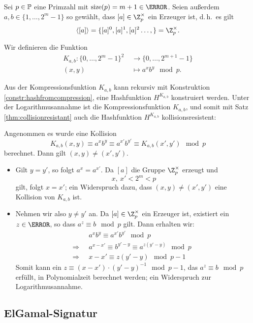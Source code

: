 \begin{example}
 Sei $p \in \mathbb P$ eine Primzahl mit $\size(p) = m + 1 \in \N$. Seien außerdem $a, b \in \{1, \dotsc, 2^{m}-1\}$ so gewählt, dass $[a] \in \Z_p^{\times}$ ein Erzeuger ist, d.\,h.~es gilt \[\langle [a] \rangle = \{[a]^0, [a]^1, [a]^2 \dotsc, \} = \Z_p^{\times}.\] 
 
 Wir definieren die Funktion
 \begin{align*}
K_{a, b}: \{0, \dotsc, 2^m-1\}^2 & \; → \{0, \dotsc, 2^{m+1}-1\} \\
(x, y) & \; ↦ a^xb^y \mod p.
 \end{align*}

 Aus der Kompressionsfunktion $K_{a, b}$ kann rekursiv mit Konstruktion \ref{constr:hashfromcompression},
 eine Hashfunktion $H^{K_{a, b}}$ konstruiert werden. Unter der Logarithmusannahme ist die Kompressionsfunktion $K_{a, b}$, und somit mit Satz \ref{thm:collisionresistant} auch die Hashfunktion $H^{K_{a, b}}$ kollisionsresistent:
 
 Angenommen es wurde eine Kollision 
 \[K_{a, b}(x, y) \equiv a^xb^y \equiv a^{x'}b^{y'} \equiv K_{a, b}(x', y') \mod p\] 
 berechnet. Dann gilt $(x, y) ≠ (x', y')$. 
 \begin{itemize}
  \item Gilt $y = y'$, so folgt $a^x = a^{x'}$. Da $[a]$ die Gruppe $\Z_p^{\times}$ erzeugt und 
  \[x, \  x' < 2^{m} < p\] gilt,
  folgt $x = x'$; ein Widerspruch dazu, dass $(x, y) ≠ (x', y')$ eine Kollision von $K_{a, b}$ ist.
  \item Nehmen wir also $y ≠ y'$ an. Da $[a] \in \Z_p^{\times}$ ein Erzeuger ist, existiert ein $z  \in \N$, so dass $a^z \equiv b \mod p$ gilt. Dann erhalten wir:
 \begin{align*}
  &  \; \; a^xb^y \equiv a^{x'}b^{y'} \mod p\;\;  \\ 
\Rightarrow &\;\; a^{x-x'} \equiv b^{y'-y} \equiv a^{z(y' - y)} \mod p \;\; \\
 \Rightarrow &\;\; x-x' \equiv z(y' -y) \mod p-1
 \end{align*}
  Somit kann ein $z \equiv (x-x') \cdot (y' - y)^{-1} \mod p-1$, das $a^z \equiv b \mod p$ erfüllt, in Polynomialzeit berechnet werden; ein Widerspruch zur Logarithmusannahme.
 \end{itemize}
\end{example}


\subsection{ElGamal-Signatur}

